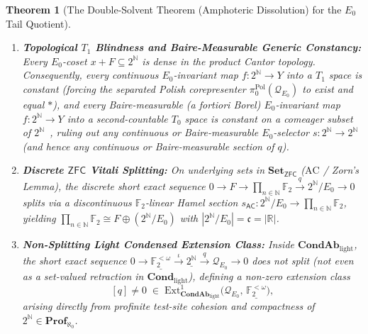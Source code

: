 \documentclass[10pt,twoside,openright]{book}
\theoremstyle{crmplain}
\newtheorem{theorem}{Theorem}[section]
\theoremstyle{crmdef}
\theoremstyle{crmremark}
\begin{document}
\begin{theorem}[The Double-Solvent Theorem (Amphoteric Dissolution) for the $E_0$ Tail Quotient]
\begin{enumerate}[label=\textup{(\roman*)},leftmargin=2.0em]
  \item \textbf{Topological $T_1$ Blindness and Baire-Measurable Generic Constancy:} Every $E_0$-coset $x + F \subseteq 2^{\mathbb{N}}$ is dense in the product Cantor topology. Consequently, every continuous $E_0$-invariant map $f : 2^{\mathbb{N}} \to Y$ into a $T_1$ space is constant (forcing the separated Polish corepresenter $\pi_0^{\mathrm{Pol}}(\mathcal{Q}_{E_0})$ to exist and equal $*$), and every Baire-measurable (a fortiori Borel) $E_0$-invariant map $f : 2^{\mathbb{N}} \to Y$ into a second-countable $T_0$ space is constant on a comeager subset of $2^{\mathbb{N}}$~\cite[Theorem~8.46]{Kechris95}, ruling out any continuous or Baire-measurable $E_0$-selector $s : 2^{\mathbb{N}} \to 2^{\mathbb{N}}$ (and hence any continuous or Baire-measurable section of $q$).
  \item \textbf{Discrete $\mathsf{ZFC}$ Vitali Splitting:} On underlying sets in $\mathbf{Set}_{\mathsf{ZFC}}$ ($\mathrm{AC}$ / Zorn's Lemma), the discrete short exact sequence $0 \to F \to \prod_{n \in \mathbb{N}} \mathbb{F}_2 \xrightarrow{q} 2^{\mathbb{N}}/E_0 \to 0$ splits via a discontinuous $\mathbb{F}_2$-linear Hamel section $s_{\mathsf{AC}} : 2^{\mathbb{N}}/E_0 \to \prod_{n \in \mathbb{N}} \mathbb{F}_2$, yielding $\prod_{n \in \mathbb{N}} \mathbb{F}_2 \cong F \oplus (2^{\mathbb{N}}/E_0)$ with $|2^{\mathbb{N}}/E_0| = \mathfrak{c} = |\mathbb{R}|$.
  \item \textbf{Non-Splitting Light Condensed Extension Class:} Inside $\mathbf{CondAb}_{\mathrm{light}}$, the short exact sequence $0 \to \underline{\mathbb{F}_2^{<\omega}} \xrightarrow{\iota} \underline{2^{\mathbb{N}}} \xrightarrow{q} \mathcal{Q}_{E_0} \to 0$ does not split (not even as a set-valued retraction in $\mathbf{Cond}_{\mathrm{light}}$), defining a non-zero extension class
  \[
    [q] \neq 0 \;\in\; \mathrm{Ext}^1_{\mathbf{CondAb}_{\mathrm{light}}}\!\bigl(\mathcal{Q}_{E_0},\, \underline{\mathbb{F}_2^{<\omega}}\bigr),
  \]
  arising directly from profinite test-site cohesion and compactness of $2^{\mathbb{N}} \in \mathbf{Prof}_{\aleph_0}$.
\end{enumerate}

\end{theorem}
\end{document}
